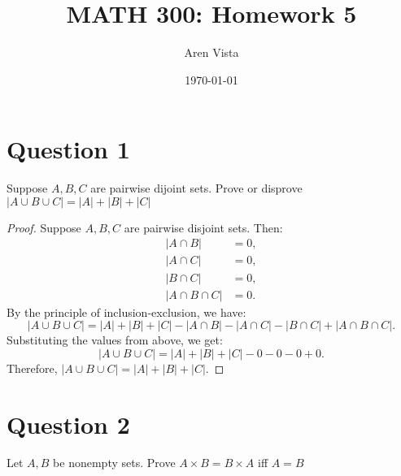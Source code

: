 \documentclass[11pt]{article}
\title{ MATH 300: Homework 5}
\author{ Aren Vista }
\date{\today}
\theoremstyle{plain}
\begin{document}
\maketitle	
\pagebreak

\section{Question 1}
Suppose $A,B,C$ are pairwise dijoint sets. Prove or disprove $| A \cup B \cup C| = |A| + |B| + |C|$

\begin{proof}
    Suppose $A, B, C$ are pairwise disjoint sets. Then:
    \begin{align*}
        |A \cap B| &= 0, \\
        |A \cap C| &= 0, \\
        |B \cap C| &= 0, \\
        |A \cap B \cap C| &= 0.
    \end{align*}
    By the principle of inclusion-exclusion, we have:
    \[
    |A \cup B \cup C| = |A| + |B| + |C| - |A \cap B| - |A \cap C| - |B \cap C| + |A \cap B \cap C|.
    \]
    Substituting the values from above, we get:
    \[
    |A \cup B \cup C| = |A| + |B| + |C| - 0 - 0 - 0 + 0.
    \]
    Therefore, $|A \cup B \cup C| = |A| + |B| + |C|$.
\end{proof}

\section{Question 2}
Let $A,B$ be nonempty sets. Prove $A \times B = B \times A$ iff $A=B$
\end{document}
